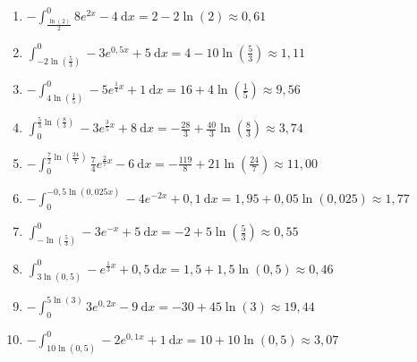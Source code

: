 \documentclass[a4paper,12pt, headsepline, ngerman]{scrartcl}
\theoremstyle{definition}
\newcommand{\td}{\ \text{d}}
\newcommand{\fakesubsection}[1]{%
	\par\refstepcounter{subsection}%
	\subsectionmark{#1}%
	\addcontentsline{toc}{subsection}{\protect\numberline{\thesubsection}#1}%
}
\begin{document}
\begin{Answer}[ref=flaecheRechnA2]\\
	\begin{enumerate}[label=\alph*)]
		\item \(\displaystyle-\int_{\frac{\ln(2)}{2}}^{0} 8e^{2x}-4 \td x=2-2\ln(2)\approx 0,61\)\\
		\item \(\displaystyle\int_{-2\ln\left(\tfrac{5}{3}\right)}^{0} -3e^{0,5x}+5 \td x=4-10\ln\left(\tfrac{5}{3}\right)\approx1,11\)\\
		\item \(\displaystyle-\int_{4\ln\left(\tfrac{1}{5}\right)}^{0} -5e^{\tfrac{1}{4}x}+1 \td x=16+4\ln\left(\tfrac{1}{5}\right)\approx 9,56\)\\
		\item \(\displaystyle\int_{0}^{\tfrac{5}{3}\ln\left(\tfrac{8}{3}\right)} -3e^{\tfrac{3}{5}x}+8 \td x=-\tfrac{28}{3}+\tfrac{40}{3}\ln\left(\tfrac{8}{3}\right)\approx 3,74\)\\
		\item \(\displaystyle-\int_{0}^{\tfrac{7}{2}\ln\left(\tfrac{24}{7}\right)} \tfrac{7}{4}e^{\tfrac{2}{7}x}-6 \td x=-\tfrac{119}{8}+21\ln\left(\tfrac{24}{7}\right)\approx 11,00\)\\
		\item \(\displaystyle-\int_{0}^{-0,5\ln(0,025x)} -4e^{-2x}+0,1 \td x= 1,95+0,05\ln(0,025)\approx 1,77\)\\
		\item \(\displaystyle\int_{-\ln\left(\tfrac{5}{3}\right)}^{0} -3e^{-x}+5 \td x=-2+5\ln\left(\tfrac{5}{3}\right)\approx 0,55\)\\
		\item \(\displaystyle\int_{3\ln(0,5)}^{0} -e^{\tfrac{1}{3}x}+0,5 \td x=1,5+1,5\ln(0,5)\approx 0,46\)\\
		\item \(\displaystyle-\int_{0}^{5\ln(3)} 3e^{0,2x}-9 \td x=-30+45\ln(3)\approx 19,44\)\\
		\item \(\displaystyle-\int_{10\ln(0,5)}^{0} -2e^{0,1x}+1 \td x=10+10\ln(0,5)\approx 3,07\)
	\end{enumerate}
\end{Answer}
\end{document}

